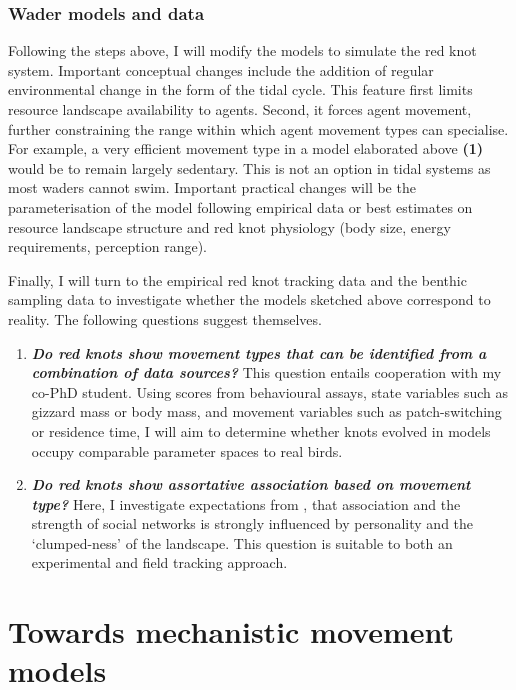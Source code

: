 \section{Wader models and data}

Following the steps above, I will modify the models to simulate the red knot system. Important conceptual changes include the addition of regular environmental change in the form of the tidal cycle. This feature first limits resource landscape availability to agents. Second, it forces agent movement, further constraining the range within which agent movement types can specialise. For example, a very efficient movement type in a model elaborated above \textbf{(1)} would be to remain largely sedentary. This is not an option in tidal systems as most waders cannot swim. Important practical changes will be the parameterisation of the model following empirical data or best estimates on resource landscape structure and red knot physiology (body size, energy requirements, perception range).

Finally, I will turn to the empirical red knot tracking data and the benthic sampling data to investigate whether the models sketched above correspond to reality. The following questions suggest themselves.

\begin{enumerate}
\def\labelenumi{\arabic{enumi}.}
\setcounter{enumi}{3}
\item
  \textbf{\emph{Do red knots show movement types that can be identified
  from a combination of data sources?}} This question entails
  cooperation with my co-PhD student. Using scores from behavioural
  assays, state variables such as gizzard mass or body mass, and
  movement variables such as patch-switching or residence time, I will
  aim to determine whether knots evolved in models occupy comparable
  parameter spaces to real birds.
\item
  \textbf{\emph{Do red knots show assortative association based on
  movement type?}} Here, I investigate expectations from
  \citet{spiegel2017}, that association and the strength of social
  networks is strongly influenced by personality and the `clumped-ness'
  of the landscape. This question is suitable to both an experimental
  and field tracking approach.
\end{enumerate}

\part{Towards mechanistic movement models}

